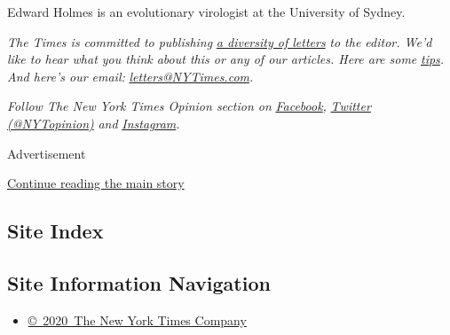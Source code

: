 Edward Holmes is an evolutionary virologist at the University of Sydney.

\emph{The Times is committed to publishing}
\href{https://www.nytimes3xbfgragh.onion/2019/01/31/opinion/letters/letters-to-editor-new-york-times-women.html}{\emph{a
diversity of letters}} \emph{to the editor. We'd like to hear what you
think about this or any of our articles. Here are some}
\href{https://help.nytimes3xbfgragh.onion/hc/en-us/articles/115014925288-How-to-submit-a-letter-to-the-editor}{\emph{tips}}\emph{.
And here's our email:}
\href{mailto:letters@NYTimes.com}{\emph{letters@NYTimes.com}}\emph{.}

\emph{Follow The New York Times Opinion section on}
\href{https://www.facebookcorewwwi.onion/nytopinion}{\emph{Facebook}}\emph{,}
\href{http://twitter.com/NYTOpinion}{\emph{Twitter (@NYTopinion)}}
\emph{and}
\href{https://www.instagram.com/nytopinion/}{\emph{Instagram}}\emph{.}

Advertisement

\protect\hyperlink{after-bottom}{Continue reading the main story}

\hypertarget{site-index}{%
\subsection{Site Index}\label{site-index}}

\hypertarget{site-information-navigation}{%
\subsection{Site Information
Navigation}\label{site-information-navigation}}

\begin{itemize}
\tightlist
\item
  \href{https://help.nytimes3xbfgragh.onion/hc/en-us/articles/115014792127-Copyright-notice}{©~2020~The
  New York Times Company}
\end{itemize}

